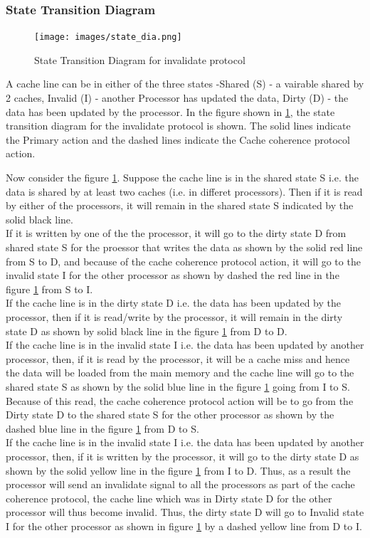 \documentclass[12pt]{article}
\begin{document}
\subsubsection{State Transition Diagram}
\begin{figure}[H]
    \centering
    \texttt{[image: images/state\_dia.png]}
    \caption{State Transition Diagram for invalidate protocol}
    \label{fig:state_transition}
\end{figure}
A cache line can be in either of the three states -Shared (S) - a vairable shared by 2 caches,
Invalid (I) - another Processor has updated the data, Dirty (D) - the data has been updated by the processor.
In the figure shown in \ref{fig:state_transition}, the state transition diagram for the invalidate protocol is shown.
The solid lines indicate the Primary action and the dashed lines indicate the Cache coherence protocol action.

Now consider the figure \ref{fig:state_transition}. Suppose the cache line is in the shared state S i.e. the data is shared by at least two caches (i.e. in differet processors).
Then if it is read by either of the processors, it will remain in the shared state S indicated by the solid black line. \\
If it is written by one of the the processor, it will go to the dirty state D from shared 
state S for the proessor that writes the data as shown by the solid red line from S to D, and because of the cache coherence protocol action, it will go to the invalid state I for the other processor as shown by dashed the red line in the
figure \ref{fig:state_transition} from S to I. \\
If the cache line is in the dirty state D i.e. the data has been updated by the processor, then if it is read/write by the processor, it will remain in the dirty state D as shown by solid black line in the figure \ref{fig:state_transition} from D to D.\\
If the cache line is in the invalid state I i.e. the data has been updated by another processor, then, if it is read by the processor, it will 
be a cache miss and hence the data will be loaded from the main memory and the cache line will go to the shared state S as shown by the solid blue line in the figure \ref{fig:state_transition} going from I to S.
Because of this read, the cache coherence protocol action will be to go from the Dirty state D to the shared state S for the other processor as shown by the dashed blue line in the figure \ref{fig:state_transition} from D to S.\\
If the cache line is in the invalid state I i.e. the data has been updated by another processor, then, if it is written by the processor, it will go to the dirty state D as shown by the solid yellow line in the figure \ref{fig:state_transition} from I to D.
Thus, as a result the processor will send an invalidate signal to all the processors as part of the cache coherence protocol, the cache line which was in Dirty state D for the other processor
will thus become invalid. Thus, the dirty state D will go to Invalid state I for the other processor as shown in figure \ref{fig:state_transition} by a dashed yellow line from D to I. \\
\end{document}

